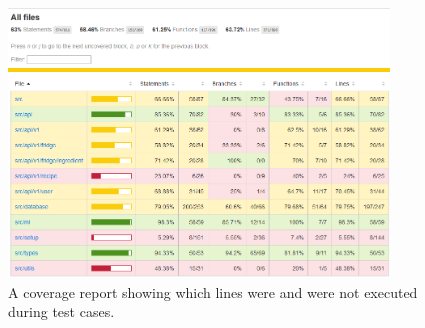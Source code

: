 \documentclass[11pt, twoside, a4paper]{report}
\begin{document}
\begin{figure}
    \centering
    \caption{\label{fig:coverage_report}A coverage report showing which lines were and were not executed during test cases.}
    \includegraphics[width=0.9\textwidth]{figures/coverage_report.png}
\end{figure}



\todos{}

\end{document}
